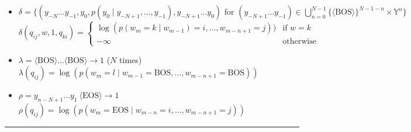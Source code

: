 \begin{itemize}
\begin{itemize}
        \item $\delta = \big\{ (y_{-N} \ldots y_{-1}, y_0, p(y_0 \mid y_{-N+1}, \ldots, y_{-1}), y_{-N+1} \ldots y_0 ) \textrm{ for } (y_{-N+1} \ldots y_{-1}) \in \bigcup_{n=0}^{N-1} \{ \langle \textrm{BOS} \rangle \}^{N-1-n} \times \mathbb{Y}^n  \big\}
        $
        \\
        $
        \delta(q_{ij}, w, 1, q_{ki}) = 
        \begin{cases} 
            \log(p(w_m = k \mid w_{m-1} ) = i, \ldots, w_{m-n+1} = j)) & \textrm{if } w=k \\
            -\infty & \textrm{otherwise}
        \end{cases}
        $
        \item $\lambda = \langle \textrm{BOS} \rangle \ldots \langle \textrm{BOS} \rangle \to 1$ ($N$ times)\\
        $\lambda(q_{ij}) = \log(p(w_m = l \mid w_{m-1} = \textrm{BOS}, \ldots, w_{m-n+1} = \textrm{BOS}))$
        \item $\rho = y_{n-N+1} \ldots y_1 \ \langle \textrm{EOS} \rangle \to 1$\\
        $
        \rho(q_{ij}) = \log(p(w_m = \textrm{EOS} \mid w_{m-n} = i, \ldots, w_{m-n+1} = j))
        $
    \end{itemize}
\end{itemize}

{\color{lightgrey}\hrule height 0.001mm}

